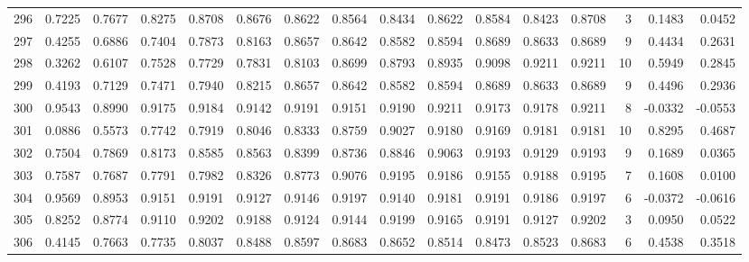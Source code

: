 \begin{tabular}{lrrrrrrrrrrrrrrr}
296 &      0.7225 &  0.7677 &  0.8275 &  0.8708 &  0.8676 &  0.8622 &  0.8564 &  0.8434 &  0.8622 &  0.8584 &   0.8423 &     0.8708 &      3 &                    0.1483 &                     0.0452 \\
297 &      0.4255 &  0.6886 &  0.7404 &  0.7873 &  0.8163 &  0.8657 &  0.8642 &  0.8582 &  0.8594 &  0.8689 &   0.8633 &     0.8689 &      9 &                    0.4434 &                     0.2631 \\
298 &      0.3262 &  0.6107 &  0.7528 &  0.7729 &  0.7831 &  0.8103 &  0.8699 &  0.8793 &  0.8935 &  0.9098 &   0.9211 &     0.9211 &     10 &                    0.5949 &                     0.2845 \\
299 &      0.4193 &  0.7129 &  0.7471 &  0.7940 &  0.8215 &  0.8657 &  0.8642 &  0.8582 &  0.8594 &  0.8689 &   0.8633 &     0.8689 &      9 &                    0.4496 &                     0.2936 \\
300 &      0.9543 &  0.8990 &  0.9175 &  0.9184 &  0.9142 &  0.9191 &  0.9151 &  0.9190 &  0.9211 &  0.9173 &   0.9178 &     0.9211 &      8 &                   -0.0332 &                    -0.0553 \\
301 &      0.0886 &  0.5573 &  0.7742 &  0.7919 &  0.8046 &  0.8333 &  0.8759 &  0.9027 &  0.9180 &  0.9169 &   0.9181 &     0.9181 &     10 &                    0.8295 &                     0.4687 \\
302 &      0.7504 &  0.7869 &  0.8173 &  0.8585 &  0.8563 &  0.8399 &  0.8736 &  0.8846 &  0.9063 &  0.9193 &   0.9129 &     0.9193 &      9 &                    0.1689 &                     0.0365 \\
303 &      0.7587 &  0.7687 &  0.7791 &  0.7982 &  0.8326 &  0.8773 &  0.9076 &  0.9195 &  0.9186 &  0.9155 &   0.9188 &     0.9195 &      7 &                    0.1608 &                     0.0100 \\
304 &      0.9569 &  0.8953 &  0.9151 &  0.9191 &  0.9127 &  0.9146 &  0.9197 &  0.9140 &  0.9181 &  0.9191 &   0.9186 &     0.9197 &      6 &                   -0.0372 &                    -0.0616 \\
305 &      0.8252 &  0.8774 &  0.9110 &  0.9202 &  0.9188 &  0.9124 &  0.9144 &  0.9199 &  0.9165 &  0.9191 &   0.9127 &     0.9202 &      3 &                    0.0950 &                     0.0522 \\
306 &      0.4145 &  0.7663 &  0.7735 &  0.8037 &  0.8488 &  0.8597 &  0.8683 &  0.8652 &  0.8514 &  0.8473 &   0.8523 &     0.8683 &      6 &                    0.4538 &                     0.3518 \\

\end{tabular}
